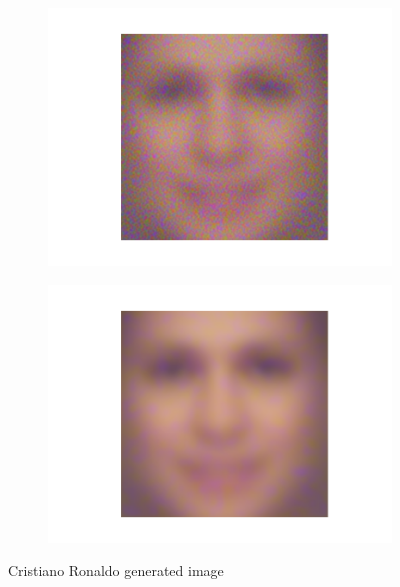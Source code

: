 \documentclass[10pt,twocolumn,letterpaper]{article}
\begin{document}
\begin{figure}[h]
\begin{subfigure}[b]{0.24\linewidth}
        \includegraphics[trim={4.5cm 1.5cm 4.5cm 1.5cm},clip, width=\linewidth]{images/outputs/sequence/image-40.png}
    \end{subfigure}
    \begin{subfigure}[b]{0.24\linewidth}
        \includegraphics[trim={4.5cm 1.5cm 4.5cm 1.5cm},clip, width=\linewidth]{images/outputs/sequence/image-300.png}
    \end{subfigure}
    \caption{Cristiano Ronaldo generated image}
    \label{fig:ronaldo}
\end{figure}

\end{document}
